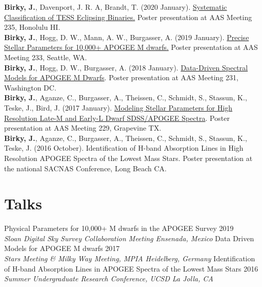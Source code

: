 \documentclass[margin,line]{resume}
\begin{document}
\begin{resume}
\textbf{Birky, J.}, Davenport, J. R. A, Brandt, T. (2020 January). \href{https://doi.org/10.5281/zenodo.3605647}{Systematic Classification of TESS Eclipsing Binaries.} Poster presentation at AAS Meeting 235, Honolulu HI. \\
\newline
\textbf{Birky, J.}, Hogg, D. W., Mann, A. W., Burgasser, A. (2019 January). \href{https://doi.org/10.5281/zenodo.2536586}{Precise Stellar Parameters for 10,000+ APOGEE M dwarfs.} Poster presentation at AAS Meeting 233, Seattle, WA. \\
\newline
\textbf{Birky, J.}, Hogg, D. W., Burgasser, A. (2018 January). \href{http://doi.org/10.5281/zenodo.1146909}{Data-Driven Spectral Models for APOGEE M Dwarfs}. Poster presentation at AAS Meeting 231, Washington DC. \\
\newline
\textbf{Birky, J.}, Aganze, C., Burgasser, A., Theissen, C., Schmidt, S., Stassun, K.,  Teske, J., Bird, J. (2017 January). \href{http://doi.org/10.5281/zenodo.1116625}{Modeling Stellar Parameters for High Resolution Late-M and Early-L Dwarf SDSS/APOGEE Spectra}. Poster presentation at AAS Meeting 229, Grapevine TX.  \\
\newline
\textbf{Birky, J.}, Aganze, C., Burgasser, A., Theissen, C., Schmidt, S., Stassun, K.,  Teske, J. (2016 October). Identification of H-band Absorption Lines in High Resolution APOGEE Spectra of the Lowest Mass Stars. Poster presentation at the national SACNAS Conference, Long Beach CA. 



\section{\mysidestyle \textcolor{bcolor}{Talks}}
Physical Parameters for 10,000+ M dwarfs in the APOGEE Survey \hfill 2019 \\ 
\-\hspace{.25cm} \textit{Sloan Digital Sky Survey Collaboration Meeting \hfill Ensenada, Mexico}\vspace{.1cm} \newline
Data Driven Models for APOGEE M dwarfs \hfill 2017 \\ 
\-\hspace{.25cm} \textit{Stars Meeting  \& Milky Way Meeting, MPIA \hfill Heidelberg, Germany}\vspace{.1cm} \newline
\newpage
Identification of H-band Absorption Lines in APOGEE Spectra of the Lowest Mass Stars \hfill 2016 \\ 
\-\hspace{.25cm} \textit{Summer Undergraduate Research Conference, UCSD \hfill La Jolla, CA}



\end{resume}
\end{document}
